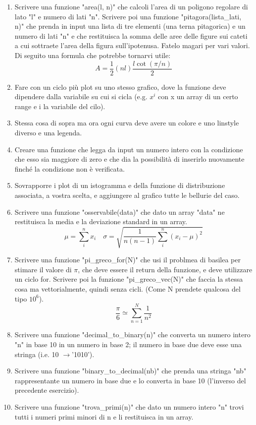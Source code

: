 \documentclass[10pt,a4paper]{article}
\begin{document}
\begin{enumerate}
\item Scrivere una funzione "area(l, n)" che calcoli l'area di un poligono regolare di lato 
"l" e numero di lati "n". Scrivere poi una funzione "pitagora(lista\_lati, n)" che prenda in 
input una lista di tre elementi (una terna pitagorica) e un numero di lati "n" e che 
restituisca la somma delle aree delle figure sui cateti a cui sottraete l'area della 
figura sull'ipotenusa. Fatelo magari per vari valori. Di seguito una formula che potrebbe tornarvi utile:
\[
A = \frac{1}{2}(nl)\frac{l \cot(\pi/n)}{2}
\]
\item Fare con un ciclo più plot su uno stesso grafico, dove la funzione deve dipendere dalla variabile su cui si cicla (e.g. $x^i$ con x un array di un certo range e i la variabile del cilo).
\item Stessa cosa di sopra ma ora ogni curva deve avere un colore e uno linstyle diverso e una legenda.
\item Creare una funzione che legga da input un numero intero con la condizione che esso sia maggiore di zero e che dia la possibilità di inserirlo nuovamente finché la condizione non è verificata.
\item Sovrapporre i plot di un istogramma e della funzione di distribuzione associata, a vostra scelta, e aggiungere al grafico tutte le bellurie del caso.
\item Scrivere una funzione "osservabile(data)" che dato un array "data" ne restituisca la media e la deviazione standard in un array.
\[ 
\mu = \sum_i^{n} x_i \quad \sigma =  \sqrt{ \frac{1}{n(n-1)} \sum_i^n (x_i - \mu)^2 } 
\]
\item Scrivere una funzione "pi\_greco\_for(N)" che usi il problmea di basilea per stimare il valore di $\pi$, che deve essere il return della funzione, e deve utilizzare un ciclo for. Scrivere poi la funzione "pi\_greco\_vec(N)" che faccia la stessa cosa ma vettorialmente, quindi senza cicli. (Come N prendete qualcosa del tipo $10^6$).
\[
\frac{\pi}{6} \simeq \sum_{n=1}^N \frac{1}{n^2}
\]
\item Scrivere una funzione "decimal\_to\_binary(n)" che converta un numero intero "n" in base 10 in un numero in base 2; il numero in base due deve esse una stringa (i.e. 10 $\rightarrow$'1010').
\item Scrivere una funzione "binary\_to\_decimal(nb)" che prenda una stringa "nb" rappresentante un numero in base due e lo converta in base 10 (l'inverso del precedente esercizio).
\item Scrivere una funzione "trova\_primi(n)" che dato un numero intero "n" trovi tutti i numeri primi minori di n e li restituisca in un array.

\end{enumerate}
\end{document}
